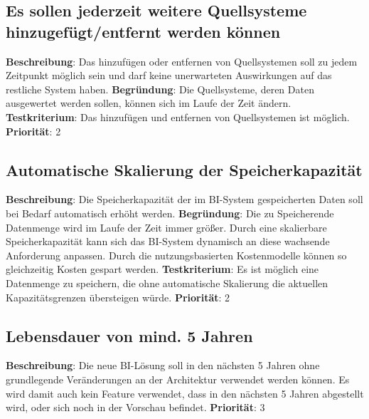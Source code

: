 \subsection{Es sollen jederzeit weitere Quellsysteme hinzugefügt/entfernt werden können} \label{sec:anforderungsspezifikation:QuellsystemeÄndern}
\textbf{Beschreibung}: Das hinzufügen oder entfernen von Quellsystemen soll zu jedem Zeitpunkt möglich sein und darf keine unerwarteten Auswirkungen auf das restliche System haben.
\newline \textbf{Begründung}: Die Quellsysteme, deren Daten ausgewertet werden sollen, können sich im Laufe der Zeit ändern.
\newline \textbf{Testkriterium}: Das hinzufügen und entfernen von Quellsystemen ist möglich.
\newline \textbf{Priorität}: 2

\subsection{Automatische Skalierung der Speicherkapazität} \label{sec:anforderungsspezifikation:skalierungDerSpeicherkapazität}
\textbf{Beschreibung}: Die Speicherkapazität der im BI-System gespeicherten Daten soll bei Bedarf automatisch erhöht werden.
\newline \textbf{Begründung}: Die zu Speicherende Datenmenge wird im Laufe der Zeit immer größer. Durch eine skalierbare Speicherkapazität kann sich das BI-System dynamisch an diese wachsende Anforderung anpassen. Durch die nutzungsbasierten Kostenmodelle können so gleichzeitig Kosten gespart werden.
\newline \textbf{Testkriterium}: Es ist möglich eine Datenmenge zu speichern, die ohne automatische Skalierung die aktuellen Kapazitätsgrenzen übersteigen würde.
\newline \textbf{Priorität}: 2

\subsection{Lebensdauer von mind. 5 Jahren} \label{sec:anforderungsspezifikation:langlebigkeit}
\textbf{Beschreibung}: Die neue BI-Lösung soll in den nächsten 5 Jahren ohne grundlegende Veränderungen an der Architektur verwendet werden können. Es wird damit auch kein Feature verwendet, dass in den nächsten 5 Jahren abgestellt wird, oder sich noch in der Vorschau befindet.
\newline \textbf{Priorität}: 3

